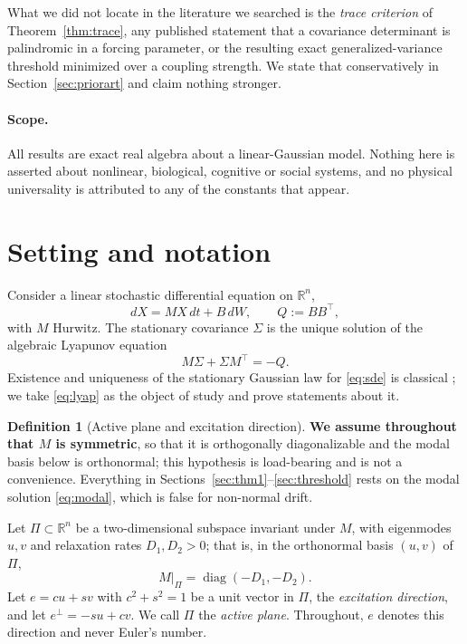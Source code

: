 \documentclass[11pt]{article}
\theoremstyle{plain}
\theoremstyle{definition}
\newtheorem{definition}[theorem]{Definition}
\theoremstyle{remark}
\newcommand{\Real}{\mathbb{R}}
\newcommand{\Sig}{\Sigma}
\newcommand{\eperp}{e^{\perp}}
\newcommand{\T}{^{\!\top}}
\begin{document}
What we did not locate in the literature we searched is the \emph{trace criterion} of
Theorem~\ref{thm:trace}, any published statement that a covariance determinant is palindromic in
a forcing parameter, or the resulting exact generalized-variance threshold minimized over a
coupling strength. We state that conservatively in Section~\ref{sec:priorart} and claim nothing
stronger.

\paragraph{Scope.} All results are exact real algebra about a linear-Gaussian model. Nothing here
is asserted about nonlinear, biological, cognitive or social systems, and no physical universality
is attributed to any of the constants that appear.

\section{Setting and notation}\label{sec:setting}

Consider a linear stochastic differential equation on $\Real^n$,
\begin{equation}
  dX = MX\,dt + B\,dW, \qquad Q := BB\T, \label{eq:sde}
\end{equation}
with $M$ Hurwitz. The stationary covariance $\Sig$ is the unique solution of the algebraic
Lyapunov equation
\begin{equation}
  M\Sig + \Sig M\T = -Q. \label{eq:lyap}
\end{equation}
Existence and uniqueness of the stationary Gaussian law for \eqref{eq:sde} is classical
\cite{Gardiner2004,Vatiwutipong2019}; we take \eqref{eq:lyap} as the object of study and prove
statements about it.

\begin{definition}[Active plane and excitation direction]\label{def:active}
\textbf{We assume throughout that $M$ is symmetric}, so that it is orthogonally diagonalizable
and the modal basis below is orthonormal; this hypothesis is load-bearing and is not a
convenience. Everything in Sections~\ref{sec:thm1}--\ref{sec:threshold} rests on the modal
solution \eqref{eq:modal}, which is false for non-normal drift.

Let $\Pi\subset\Real^n$ be a two-dimensional subspace invariant under $M$, with eigenmodes
$u,v$ and relaxation rates $D_1,D_2>0$; that is, in the orthonormal basis $(u,v)$ of $\Pi$,
\[
  M|_\Pi = \operatorname{diag}(-D_1,-D_2).
\]
Let $e=cu+sv$ with $c^2+s^2=1$ be a unit vector in $\Pi$, the \emph{excitation direction}, and let
$\eperp=-su+cv$. We call $\Pi$ the \emph{active plane}. Throughout, $e$ denotes this direction and
never Euler's number.
\end{definition}
\end{document}

